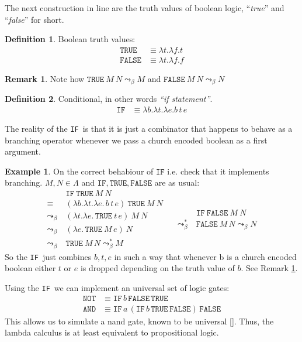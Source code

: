 \documentclass[12pt]{book}
\newcommand{\la}{\lambda}
\newcommand{\La}{\Lambda}
\newcommand{\IF}{\texttt{IF}}
\newcommand{\TRUE}{\texttt{TRUE}}
\newcommand{\FALSE}{\texttt{FALSE}}
\newcommand{\NOT}{\texttt{NOT}}
\newcommand{\AND}{\texttt{AND}}
\newcommand{\curly}{\mathrel{\leadsto}_\beta}
\theoremstyle{plain}
\theoremstyle{definition}
\newtheorem{definition}{Definition}[section]
\theoremstyle{definition}
\newtheorem{example}{Example}[section]
\theoremstyle{definition}
\newtheorem{remark}{Remark}
\begin{document}
The next construction in line are the truth values of boolean logic, ``\textit{true}'' and ``\textit{false}'' for short.
\begin{definition} Boolean truth values:
\begin{align*}
\texttt{TRUE} &\equiv \lambda t.\lambda f. t \\
\texttt{FALSE} &\equiv \lambda t.\lambda f. f
\end{align*}
\end{definition}
\begin{remark}
  \label{rem:true-false}
  Note how $\TRUE \ M \ N \curly M $ and $ \FALSE \ M \ N \curly N $
\end{remark}
\begin{definition} Conditional, in other words \textit{``if statement''}.
\begin{align*}
\texttt{IF} &\equiv \lambda b.\lambda t.\lambda e. b\,t\,e
\end{align*}
\end{definition}
The reality of the \IF \ is that it is just a combinator that happens to behave as a branching operator whenever we pass a church encoded boolean as a first argument.
\begin{example} On the correct behabiour of $\IF$ i.e. check that it implements branching. $ M, N \in \La $ and $ \IF, \TRUE, \FALSE$ are as usual:
  \[
    \begin{aligned}
      & \IF \ \TRUE \ M \ N \\
      \equiv \ & (\la b.\la t.\la e.\, b\, t\, e) \ \TRUE \ M \ N  \\
      \curly \ & (\la t.\la e.\, \TRUE\ t\, e) \ M \ N  \\
      \curly \ & (\la e.\, \TRUE\ M\, e) \ N  \\
      \curly \ & \TRUE\ M\, N \curly^* M 
    \end{aligned}
    \quad
    \begin{aligned}
      & \IF \ \FALSE \ M \ N \\
      \curly^* \ & \FALSE\ M\, N \curly N
    \end{aligned}
  \]
  So the \IF \ just combines $b, t, e$ in such a way that whenever b is a church encoded boolean either $t$ or $e$ is dropped depending on the truth value of $b$. See Remark \ref{rem:true-false}.
\end{example}

Using the \IF \ we can implement an universal set of logic gates:
\begin{align*}
  \NOT &\equiv \IF \, b \, \FALSE \, \TRUE \\
  \AND &\equiv \IF \, a \, (\IF \, b \, \TRUE \, \FALSE) \, \FALSE
\end{align*}
This allows us to simulate a nand gate, known to be universal \ref{}. Thus, the lambda calculus is at least equivalent to propositional logic.
\end{document}
